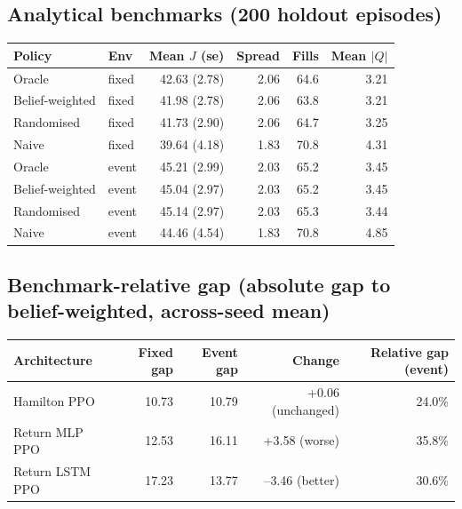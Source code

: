 \subsection*{Analytical benchmarks (200 holdout episodes)}
\begin{table}[h]
\centering
\begin{tabular}{llrrrr}
\hline
Policy & Env & Mean $J$ (se) & Spread & Fills & Mean $|Q|$ \\
\hline
Oracle           & fixed & 42.63 (2.78) & 2.06 & 64.6 & 3.21 \\
Belief-weighted  & fixed & 41.98 (2.78) & 2.06 & 63.8 & 3.21 \\
Randomised       & fixed & 41.73 (2.90) & 2.06 & 64.7 & 3.25 \\
Naive            & fixed & 39.64 (4.18) & 1.83 & 70.8 & 4.31 \\
Oracle           & event & 45.21 (2.99) & 2.03 & 65.2 & 3.45 \\
Belief-weighted  & event & 45.04 (2.97) & 2.03 & 65.2 & 3.45 \\
Randomised       & event & 45.14 (2.97) & 2.03 & 65.3 & 3.44 \\
Naive            & event & 44.46 (4.54) & 1.83 & 70.8 & 4.85 \\
\hline
\end{tabular}
\end{table}

\subsection*{Benchmark-relative gap (absolute gap to belief-weighted, across-seed mean)}
\begin{table}[h]
\centering
\begin{tabular}{lrrrr}
\hline
Architecture & Fixed gap & Event gap & Change & Relative gap (event) \\
\hline
Hamilton PPO    & 10.73 & 10.79 & +0.06 (unchanged) & 24.0\% \\
Return MLP PPO  & 12.53 & 16.11 & +3.58 (worse)      & 35.8\% \\
Return LSTM PPO & 17.23 & 13.77 & --3.46 (better)    & 30.6\% \\
\hline
\end{tabular}
\end{table}

